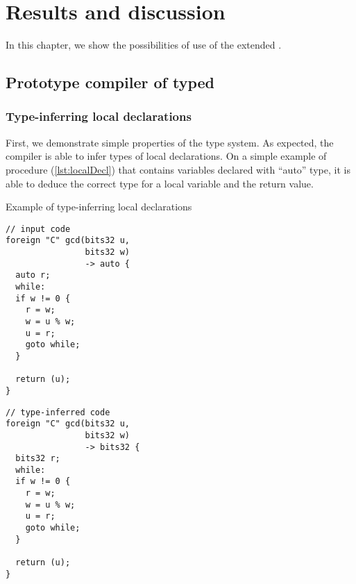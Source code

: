 \chapter{Results and discussion}
\label{chap4}

In this chapter, we show the possibilities of use of the extended \cmm.

\section{Prototype compiler of typed \cmm}
\label{sec:protoComp}

\subsection{Type-inferring local declarations}

First, we demonstrate simple properties of the type system. As expected, the compiler is able to infer types of local declarations. On a simple example of  procedure (\cref{lst:localDecl}) that contains variables declared with ``auto'' type, it is able to deduce the correct type for a local variable and the return value.

\begin{listing}
    \caption{Example of type-inferring local declarations}
    \label{lst:localDecl}
    \begin{center}
    \begin{minipage}{0.5\linewidth}
    \begin{lstlisting}
// input code
foreign "C" gcd(bits32 u,
                bits32 w)
                -> auto {
  auto r;
  while:
  if w != 0 {
    r = w;
    w = u % w;
    u = r;
    goto while;
  }

  return (u);
}
    \end{lstlisting}
    \end{minipage}%
    \begin{minipage}{0.5\linewidth}
    \begin{lstlisting}
// type-inferred code
foreign "C" gcd(bits32 u,
                bits32 w)
                -> bits32 {
  bits32 r;
  while:
  if w != 0 {
    r = w;
    w = u % w;
    u = r;
    goto while;
  }

  return (u);
}
    \end{lstlisting}
    \end{minipage}
    \end{center}
\end{listing}

